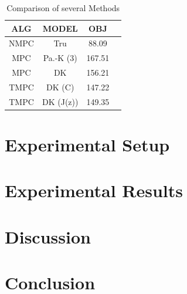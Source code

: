 \documentclass[preprint,12pt,authoryear]{elsarticle}
\begin{document}
\begin{table}[h]
  \centering
  \caption{Comparison of several Methods}
  \label{tab:ident-comp}
  \begin{tabular}{cccc}
      \toprule
        ALG & MODEL & OBJ \\
        \midrule
        NMPC & Tru & 88.09  \\%
        MPC & Pa.-K (3) & 167.51  \\
        MPC & DK & 156.21  \\
        TMPC & DK (C) & 147.22  \\
        TMPC & DK (J(z)) & 149.35  \\
        \bottomrule
  \end{tabular}
\end{table}

\section{Experimental Setup}

\section{Experimental Results}

\section{Discussion}
\section{Conclusion}

%
\end{document}
